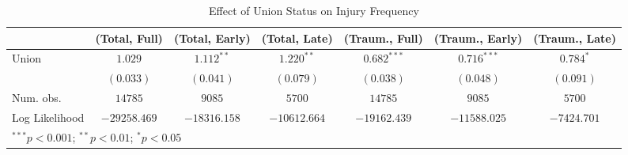 
\begin{table}[H]
\begin{center}
\begin{tabular}{l c c c c c c}
\hline
 & (Total, Full) & (Total, Early) & (Total, Late) & (Traum., Full) & (Traum., Early) & (Traum., Late) \\
\hline
Union          & $1.029$      & $1.112^{**}$ & $1.220^{**}$ & $0.682^{***}$ & $0.716^{***}$ & $0.784^{*}$ \\
               & $(0.033)$    & $(0.041)$    & $(0.079)$    & $(0.038)$     & $(0.048)$     & $(0.091)$   \\
\hline
Num. obs.      & $14785$      & $9085$       & $5700$       & $14785$       & $9085$        & $5700$      \\
Log Likelihood & $-29258.469$ & $-18316.158$ & $-10612.664$ & $-19162.439$  & $-11588.025$  & $-7424.701$ \\
\hline
\multicolumn{7}{l}{\scriptsize{$^{***}p<0.001$; $^{**}p<0.01$; $^{*}p<0.05$}}
\end{tabular}
\caption{Effect of Union Status on Injury Frequency}
\label{irr_100employees_injuries}
\end{center}
\end{table}

